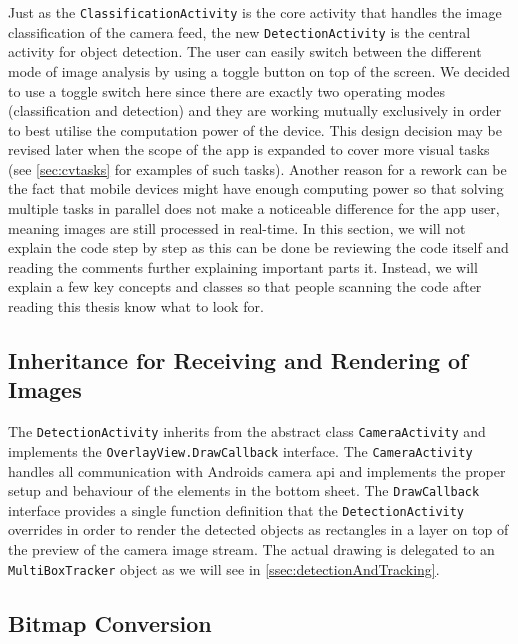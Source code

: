 \documentclass[
			   fontsize=11pt,
               paper=a4,
               bibliography=totoc,
               idxtotoc,
               headsepline,
               footsepline,
               footinclude=false,
               BCOR=12mm,
               DIV=13,
               openany,   %
               oneside    %
               ]
               {scrbook}
\newcommand{\code}[1]{\lstinline[basicstyle = \ttfamily\small]{#1}} %
\begin{document}
Just as the \code{ClassificationActivity} is the core activity that handles the image classification of the camera feed, the new \code{DetectionActivity} is the central activity for object detection. The user can easily switch between the different mode of image analysis by using a toggle button on top of the screen. We decided to use a toggle switch here since there are exactly two operating modes (classification and detection) and they are working mutually exclusively in order to best utilise the computation power of the device. This design decision may be revised later when the scope of the app is expanded to cover more visual tasks (see \autoref{sec:cvtasks} for examples of such tasks). Another reason for a rework can be the fact that mobile devices might have enough computing power so that solving multiple tasks in parallel does not make a noticeable difference for the app user, meaning images are still processed in real-time. In this section, we will not explain the code step by step as this can be done be reviewing the code itself and reading the comments further explaining important parts it. Instead, we will explain a few key concepts and classes so that people scanning the code after reading this thesis know what to look for.

\subsection{Inheritance for Receiving and Rendering of Images}

The \code{DetectionActivity} inherits from the abstract class \code{CameraActivity} and implements the \code{OverlayView.DrawCallback} interface. The \code{CameraActivity} handles all communication with Androids camera \gls{api} and implements the proper setup and behaviour of the elements in the bottom sheet. The \code{DrawCallback} interface provides a single function definition that the \code{DetectionActivity} overrides in order to render the detected objects as rectangles in a layer on top of the preview of the camera image stream. The actual drawing is delegated to an \code{MultiBoxTracker} object as we will see in \autoref{ssec:detectionAndTracking}.

\subsection{Bitmap Conversion}
\end{document}
